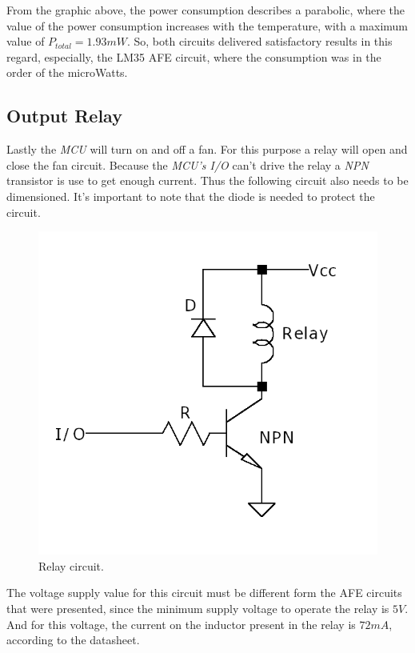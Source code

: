 \documentclass[12pt]{article}
\begin{document}
    From the graphic above, the power consumption describes a parabolic, where the value of the power consumption increases with the 
    temperature, with a maximum value of $P_{total} = 1.93 mW$. So, both circuits delivered satisfactory results in this regard, 
    especially, the LM35 AFE circuit, where the consumption was in the order of the microWatts.
\subsection{Output Relay }
    
    Lastly the \textit{MCU} will turn on and off a fan. For this purpose 
    a relay will open and close the fan circuit. Because the \textit{MCU's I/O} 
    can't drive the relay a \textit{NPN} transistor is use to get enough current.
    Thus the following circuit also needs to be dimensioned. It's important to note
    that the diode is needed to protect the circuit.
    
    \begin{figure}[H] 
        \centering
        \includegraphics*[scale = 0.4]{images/RelayDrive.png}
        \caption{Relay circuit.}
        \label{wrap-fig:1}
    \end{figure}

    The voltage supply value for this circuit must be different form the AFE circuits that were presented,
    since the minimum supply voltage to operate the relay is $5V$. And for this voltage, the 
    current on the inductor present in the relay is $72mA$, according to the datasheet.
    
\end{document}
